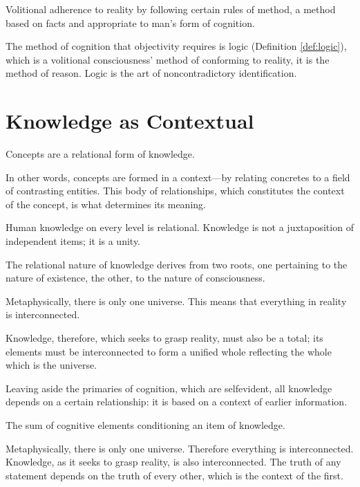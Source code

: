             \begin{definition}[Obectivity]
            \label{def:objectivity}
                Volitional adherence to reality by following certain rules of method, a method based on facts and appropriate to man's form of cognition.
            \end{definition}

        The method of cognition that objectivity requires is logic (Definition \ref{def:logic}), which is a volitional consciousness' method of conforming to reality, it is the method of reason. Logic is the art of noncontradictory identification.

    \section{Knowledge as Contextual}

        Concepts are a relational form of knowledge.

        In other words, concepts are formed in a context—by relating concretes to a field of contrasting entities. This body of relationships, which constitutes the context of the concept, is what determines its meaning.

        Human knowledge on every level is relational. Knowledge
        is not a juxtaposition of independent items; it is a unity.

        The relational nature of knowledge derives from two roots, one pertaining to the nature of existence, the other, to the nature of consciousness.

        Metaphysically, there is only one universe. This means that everything in reality is interconnected.

        Knowledge, therefore, which seeks to grasp reality, must also be a total; its elements must be interconnected to form a unified whole reflecting the whole which is the universe.

        Leaving aside the primaries of cognition, which are selfevident, all knowledge depends on a certain relationship: it is based on a context of earlier information.

        \begin{definition}[Context]
            \label{def:context}
                The sum of cognitive elements conditioning an item of knowledge.
        \end{definition}

        \begin{theorem}
            \label{the:context}
                Metaphysically, there is only one universe. Therefore everything is interconnected. Knowledge, as it seeks to grasp reality, is also interconnected. The truth of any statement depends on the truth of every other, which is the context of the first.
        \end{theorem}

